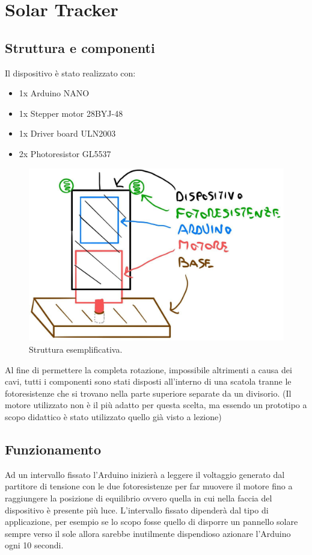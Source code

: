 \documentclass[12pt,oneside,a4paper]{article}
\begin{document}
\section{Solar Tracker}

\subsection{Struttura e componenti}
Il dispositivo è stato realizzato con:
\begin{itemize}
    \item 1x Arduino NANO
    \item 1x Stepper motor 28BYJ-48 \cite{MotorDatasheet}
    \item 1x Driver board ULN2003 \cite{DriverMotorDatasheet}
    \item 2x Photoresistor GL5537
\end{itemize}


\begin{figure}[!htb]
    \centering
    \includegraphics[width=0.5\linewidth]{figures/modello_solar_tracker}
    \caption{Struttura esemplificativa.}
\end{figure}
Al fine di permettere la completa rotazione, impossibile altrimenti a causa dei cavi, tutti i componenti sono stati disposti all'interno di una scatola tranne le fotoresistenze che si trovano nella parte superiore separate da un divisorio. (Il motore utilizzato non è il più adatto per questa scelta, ma essendo un prototipo a scopo didattico è stato utilizzato quello già visto a lezione)

\subsection{Funzionamento}
Ad un intervallo fissato l'Arduino inizierà a leggere il voltaggio generato dal partitore di tensione con le due fotoresistenze per far muovere il motore fino a raggiungere la posizione di equilibrio ovvero quella in cui nella faccia del dispositivo è presente più luce.
L'intervallo fissato dipenderà dal tipo di applicazione, per esempio se lo scopo fosse quello di disporre un pannello solare sempre verso il sole allora sarebbe inutilmente dispendioso azionare l'Arduino ogni 10 secondi.
\end{document}
